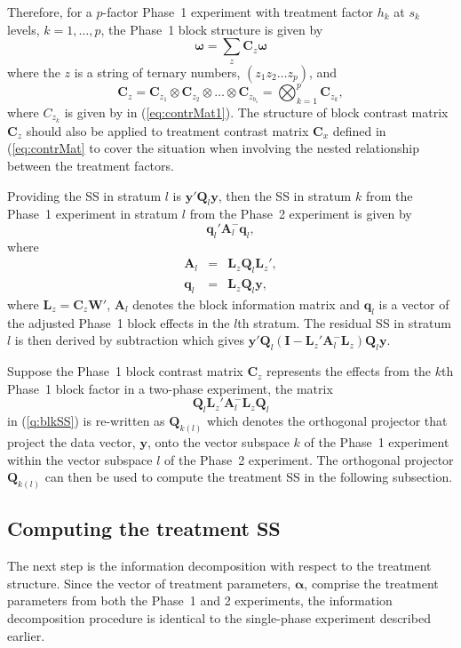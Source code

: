 \documentclass[article]{jss}
\newcommand{\I}{\mathbf{I}}
\newcommand{\Q}{\mathbf{Q}}
\newcommand{\A}{\mathbf{A}}
\newcommand{\C}{\mathbf{C}}
\newcommand{\mL}{\mathbf{L}}
\newcommand{\W}{\mathbf{W}}
\begin{document}
Therefore, for a $p$-factor Phase~1 experiment with treatment factor $h_k$ at $s_k$ levels, $k = 1, \dots, p$, the Phase~1 block structure is given by  
\begin{equation}
\bm{\omega} = \sum_z{\C_z\bm{\omega}}
\end{equation}
where the $z$ is a string of ternary numbers, $(z_1 z_2 \dots z_{p})$, and 
\[
\C_z =  \C_{z_1} \otimes  \C_{z_2} \otimes \dots \otimes  \C_{z_{b_1}} = \bigotimes^{p} _{k = 1} \C_{z_k},
\]
where $C_{z_k}$ is given by in (\ref{eq:contrMat1}). The structure of block contrast matrix $\C_{z}$ should also be applied to treatment contrast matrix $\C_{x}$ defined in (\ref{eq:contrMat} to cover the situation when involving the nested relationship between the treatment factors.

Providing the SS in stratum $l$ is $\bm{y}' \Q_l \bm{y}$, then the SS in stratum $k$ from the Phase~1 experiment in stratum $l$ from the Phase~2 experiment is given by 
\begin{equation}\label{eq:blkSS}
 \bm{q}_{l}' \A_{l}^{-} \bm{q}_{l},
\end{equation}
where
\begin{eqnarray*}
\A_l &=& \mL_{z}\Q_l\mL_{z}',\\
\bm{q}_l &=& \mL_{z}\Q_l \bm{y},
\end{eqnarray*}
where $\mL_{z} = \C_z \W'$, $\A_l$ denotes the block information matrix and $\bm{q}_l$ is a vector of the adjusted Phase~1 block effects in the $l$th stratum. The residual SS in stratum $l$ is then derived by subtraction which gives $\bm{y}'\Q_l( \I - \mL_{z}' \A_{l}^{-} \mL_{z}) \Q_l\bm{y}$.

Suppose the Phase~1 block contrast matrix $\C_z$ represents the effects from the $k$th Phase~1 block factor in a two-phase experiment, the matrix 
\[
\Q_l\mL_{z}' \A_{l}^{-} \mL_{z}\Q_l
\]
in (\ref{q:blkSS}) is re-written as $\Q_{k(l)}$ which denotes the orthogonal projector that project the data vector, $\bm{y}$, onto the vector subspace $k$ of the Phase~1 experiment within the vector subspace $l$ of the Phase~2 experiment. The orthogonal projector $\Q_{k(l)}$ can then be used to compute the treatment SS in the following subsection.

\subsection{Computing the treatment SS}
\label{subsec:trtDecomp}
The next step is the information decomposition with respect to the treatment structure. Since the vector of treatment parameters, $\bm{\alpha}$, comprise the treatment parameters from both the Phase~1 and 2 experiments, the information decomposition procedure is identical to the single-phase experiment described earlier. 
\end{document}
